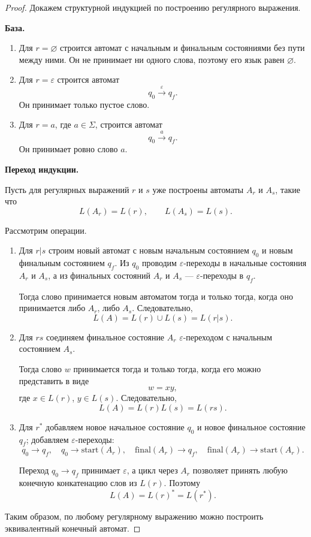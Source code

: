 \documentclass[12pt,a4paper]{article}
\begin{document}
\begin{proof}
Докажем структурной индукцией по построению регулярного выражения.

\textbf{База.}

\begin{enumerate}
    \item Для $r = \varnothing$ строится автомат с начальным и финальным состояниями без пути между ними. Он не принимает ни одного слова, поэтому его язык равен $\varnothing$.
    \item Для $r = \varepsilon$ строится автомат
    \[
    q_0 \xrightarrow{\varepsilon} q_f.
    \]
    Он принимает только пустое слово.
    \item Для $r = a$, где $a \in \Sigma$, строится автомат
    \[
    q_0 \xrightarrow{a} q_f.
    \]
    Он принимает ровно слово $a$.
\end{enumerate}

\textbf{Переход индукции.}

Пусть для регулярных выражений $r$ и $s$ уже построены автоматы $A_r$ и $A_s$, такие что
\[
L(A_r)=L(r), \qquad L(A_s)=L(s).
\]

Рассмотрим операции.

\begin{enumerate}
    \item Для $r|s$ строим новый автомат с новым начальным состоянием $q_0$ и новым финальным состоянием $q_f$. Из $q_0$ проводим $\varepsilon$-переходы в начальные состояния $A_r$ и $A_s$, а из финальных состояний $A_r$ и $A_s$ --- $\varepsilon$-переходы в $q_f$.

    Тогда слово принимается новым автоматом тогда и только тогда, когда оно принимается либо $A_r$, либо $A_s$. Следовательно,
    \[
    L(A)=L(r)\cup L(s)=L(r|s).
    \]

    \item Для $rs$ соединяем финальное состояние $A_r$ $\varepsilon$-переходом с начальным состоянием $A_s$.

    Тогда слово $w$ принимается тогда и только тогда, когда его можно представить в виде
    \[
    w = xy,
    \]
    где $x \in L(r)$, $y \in L(s)$. Следовательно,
    \[
    L(A)=L(r)L(s)=L(rs).
    \]

    \item Для $r^*$ добавляем новое начальное состояние $q_0$ и новое финальное состояние $q_f$; добавляем $\varepsilon$-переходы:
    \[
    q_0 \to q_f,\quad q_0 \to \text{start}(A_r),\quad
    \text{final}(A_r) \to q_f,\quad
    \text{final}(A_r) \to \text{start}(A_r).
    \]

    Переход $q_0 \to q_f$ принимает $\varepsilon$, а цикл через $A_r$ позволяет принять любую конечную конкатенацию слов из $L(r)$. Поэтому
    \[
    L(A)=L(r)^*=L(r^*).
    \]
\end{enumerate}

Таким образом, по любому регулярному выражению можно построить эквивалентный конечный автомат.
\end{proof}
\end{document}
